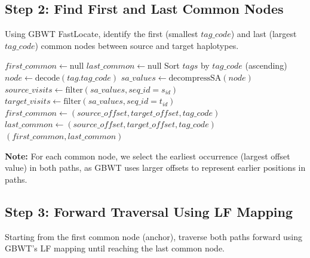 \documentclass[11pt]{article}
\begin{document}
\subsection{Step 2: Find First and Last Common Nodes}

Using GBWT FastLocate, identify the first (smallest $tag\_code$) and last (largest $tag\_code$) common nodes between source and target haplotypes.

\begin{algorithmic}[1]
    \State $first\_common \gets \text{null}$
    \State $last\_common \gets \text{null}$
    \State Sort $tags$ by $tag\_code$ (ascending)
        \State $node \gets \text{decode}(tag.tag\_code)$
        \State $sa\_values \gets \text{decompressSA}(node)$ 
        \State $source\_visits \gets \text{filter}(sa\_values, seq\_id = s_{id})$
        \State $target\_visits \gets \text{filter}(sa\_values, seq\_id = t_{id})$
            \State {}
                \State $first\_common \gets (source\_offset, target\_offset, tag\_code)$
            \EndIf
            \State $last\_common \gets (source\_offset, target\_offset, tag\_code)$ 
        \EndIf
    \EndFor
    \State \Return $(first\_common, last\_common)$
\end{algorithmic}

\textbf{Note:} For each common node, we select the earliest occurrence (largest offset value) in both paths, as GBWT uses larger offsets to represent earlier positions in paths.

\subsection{Step 3: Forward Traversal Using LF Mapping}

Starting from the first common node (anchor), traverse both paths forward using GBWT's LF mapping until reaching the last common node.
\end{document}
